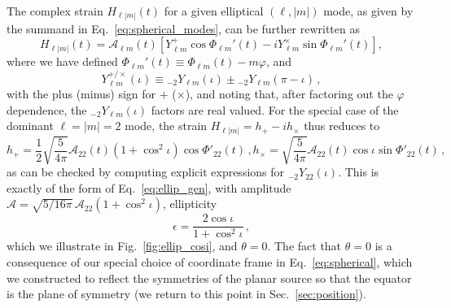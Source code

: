 \documentclass[aps,prd,twocolumn,superscriptaddress,preprintnumbers,floatfix,nofootinbib]{revtex4-2}
\newcommand{\beq}{\begin{equation}}
\newcommand{\eeq}{\end{equation}}
\newcommand*{\eq}[1]{Eq.~\eqref{eq:#1}}
\begin{document}
The complex strain $H_{\ell|m|}(t)$ for a given elliptical $(\ell, |m|)$ mode, as given by the summand in \eq{spherical_modes}, can be further rewritten as
\begin{equation}
H_{\ell|m|}(t) = \mathcal{A}_{\ell m}(t) \left[ Y^+_{\ell m} \cos \Phi_{\ell m}'(t) - 
i Y^\times_{\ell m} \sin \Phi_{\ell m}'(t) \right],
\end{equation}
where we have defined $\Phi_{\ell m}'(t) \equiv \Phi_{\ell m}(t) - m \varphi$, and
\begin{equation}
Y_{\ell m}^{+/\times}(\iota) \equiv {}_{-2} Y_{\ell m}(\iota) \pm {}_{-2} Y_{\ell m}(\pi-\iota) \, ,
\end{equation}
with the plus (minus) sign for $+$ ($\times$), and noting that, after factoring out the $\varphi$ dependence, the ${}_{-2} Y_{\ell m}(\iota)$ factors are real valued.
For the special case of the dominant $\ell=|m|=2$ mode, the strain $H_{\ell|m|} = h_+ - i h_\times$ thus reduces to
\begin{subequations} \label{eq:nonprecessing}
\beq
h_+ = \frac{1}{2} \sqrt{\frac{5}{4\pi}} \mathcal{A}_{22}(t) \left(1 + \cos^2\iota\right) \cos \Phi'_{22}(t) \, , 
\eeq
\beq
h_\times = \sqrt{\frac{5}{4\pi}} \mathcal{A}_{22}(t)  \cos\iota \sin \Phi'_{22}(t) \, ,
\eeq
\end{subequations}
as can be checked by computing explicit expressions for ${}_{-2} Y_{22}(\iota)$.
This is exactly of the form of \eq{ellip_gen}, with amplitude $\mathcal{A} = \sqrt{5/16\pi}\,\mathcal{A}_{22}\left(1+\cos^2\iota\right)$, ellipticity
\beq \label{eq:ellip_cosi}
\epsilon = \frac{2 \cos\iota}{1+\cos^2\iota}\, ,
\eeq
which we illustrate in Fig.~\ref{fig:ellip_cosi}, and $\theta = 0$.
The fact that $\theta = 0$ is a consequence of our special choice of coordinate frame in \eq{spherical}, which we constructed to reflect the symmetries of the planar source so that the equator is the plane of symmetry (we return to this point in Sec.~\ref{sec:position}).
\end{document}
